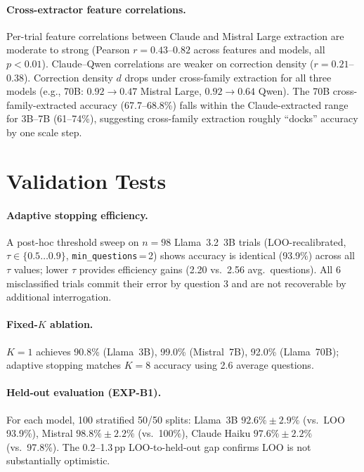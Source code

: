 \paragraph{Cross-extractor feature correlations.} Per-trial feature correlations between Claude and Mistral Large extraction are moderate to strong (Pearson $r = 0.43$--$0.82$ across features and models, all $p < 0.01$). Claude--Qwen correlations are weaker on correction density ($r = 0.21$--$0.38$). Correction density $d$ drops under cross-family extraction for all three models (e.g., 70B: $0.92 \to 0.47$ Mistral Large, $0.92 \to 0.64$ Qwen). The 70B cross-family-extracted accuracy (67.7--68.8\%) falls within the Claude-extracted range for 3B--7B (61--74\%), suggesting cross-family extraction roughly ``docks'' accuracy by one scale step.

\section{Validation Tests}
\label{app:validation_tests}
\label{sec:threshold_sweep}
\label{sec:fixed_k}
\label{sec:held_out}

\paragraph{Adaptive stopping efficiency.}
A post-hoc threshold sweep on $n=98$ Llama~3.2~3B trials (LOO-recalibrated, $\tau \in \{0.5\ldots0.9\}$, \texttt{min\_questions}\,=\,2) shows accuracy is identical (93.9\%) across all $\tau$ values; lower $\tau$ provides efficiency gains (2.20 vs.\ 2.56 avg.\ questions). All 6 misclassified trials commit their error by question 3 and are not recoverable by additional interrogation.

\paragraph{Fixed-$K$ ablation.}
$K=1$ achieves 90.8\% (Llama~3B), 99.0\% (Mistral~7B), 92.0\% (Llama~70B); adaptive stopping matches $K=8$ accuracy using 2.6 average questions.

\paragraph{Held-out evaluation (EXP-B1).}
For each model, 100 stratified 50/50 splits: Llama~3B $92.6\% \pm 2.9\%$ (vs.\ LOO 93.9\%), Mistral $98.8\% \pm 2.2\%$ (vs.\ 100\%), Claude Haiku $97.6\% \pm 2.2\%$ (vs.\ 97.8\%). The 0.2--1.3\,pp LOO-to-held-out gap confirms LOO is not substantially optimistic.


